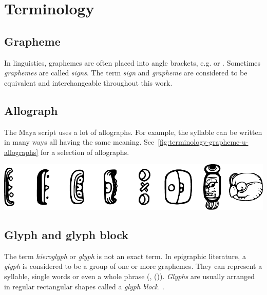 \documentclass[../main.tex]{subfiles}
\begin{document}
\chapter{Terminology}

\section{Grapheme}
In linguistics, graphemes are often placed into angle brackets, e.g.  or .
Sometimes \emph{graphemes} are called \emph{signs}.
The term \emph{sign} and \emph{grapheme} are considered to be equivalent and 
interchangeable throughout this work.

\section{Allograph}
The Maya script uses a lot of allographs.
For example, the syllable  can be written in many ways all having the same meaning.
See~\ref{fig:terminology-grapheme-u-allographs} for a selection of allographs.
\begin{center}
    \includegraphics[width=\textwidth,keepaspectratio]{img/grapheme-u-allographs}
    \label{fig:terminology-grapheme-u-allographs}
\end{center}

\section{Glyph and glyph block}
The term \emph{hieroglyph} or \emph{glyph} is not an exact term.
In epigraphic literature, a \emph{glyph} is considered to be a group of one or more graphemes.
They can represent a syllable, single words or even a whole phrase 
(\cite[1]{bricker1986}, (\cite[23]{macrilooper2003})).
\emph{Glyphs} are usually arranged in regular rectangular shapes called a \emph{glyph block}.
.
\end{document}
